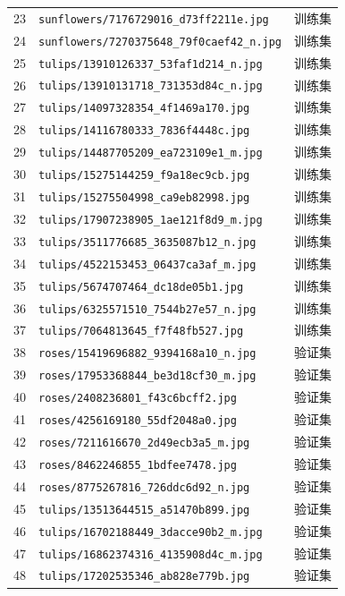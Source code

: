 \documentclass[11pt,a4paper,UTF8,fontset=windows]{ctexart}
\begin{document}
\begin{longtable}{rll}
23 & \texttt{sunflowers/7176729016\_d73ff2211e.jpg} & 训练集 \\
24 & \texttt{sunflowers/7270375648\_79f0caef42\_n.jpg} & 训练集 \\
25 & \texttt{tulips/13910126337\_53faf1d214\_n.jpg} & 训练集 \\
26 & \texttt{tulips/13910131718\_731353d84c\_n.jpg} & 训练集 \\
27 & \texttt{tulips/14097328354\_4f1469a170.jpg} & 训练集 \\
28 & \texttt{tulips/14116780333\_7836f4448c.jpg} & 训练集 \\
29 & \texttt{tulips/14487705209\_ea723109e1\_m.jpg} & 训练集 \\
30 & \texttt{tulips/15275144259\_f9a18ec9cb.jpg} & 训练集 \\
31 & \texttt{tulips/15275504998\_ca9eb82998.jpg} & 训练集 \\
32 & \texttt{tulips/17907238905\_1ae121f8d9\_m.jpg} & 训练集 \\
33 & \texttt{tulips/3511776685\_3635087b12\_n.jpg} & 训练集 \\
34 & \texttt{tulips/4522153453\_06437ca3af\_m.jpg} & 训练集 \\
35 & \texttt{tulips/5674707464\_dc18de05b1.jpg} & 训练集 \\
36 & \texttt{tulips/6325571510\_7544b27e57\_n.jpg} & 训练集 \\
37 & \texttt{tulips/7064813645\_f7f48fb527.jpg} & 训练集 \\
38 & \texttt{roses/15419696882\_9394168a10\_n.jpg} & 验证集 \\
39 & \texttt{roses/17953368844\_be3d18cf30\_m.jpg} & 验证集 \\
40 & \texttt{roses/2408236801\_f43c6bcff2.jpg} & 验证集 \\
41 & \texttt{roses/4256169180\_55df2048a0.jpg} & 验证集 \\
42 & \texttt{roses/7211616670\_2d49ecb3a5\_m.jpg} & 验证集 \\
43 & \texttt{roses/8462246855\_1bdfee7478.jpg} & 验证集 \\
44 & \texttt{roses/8775267816\_726ddc6d92\_n.jpg} & 验证集 \\
45 & \texttt{tulips/13513644515\_a51470b899.jpg} & 验证集 \\
46 & \texttt{tulips/16702188449\_3dacce90b2\_m.jpg} & 验证集 \\
47 & \texttt{tulips/16862374316\_4135908d4c\_m.jpg} & 验证集 \\
48 & \texttt{tulips/17202535346\_ab828e779b.jpg} & 验证集 \\

\end{longtable}
\end{document}
